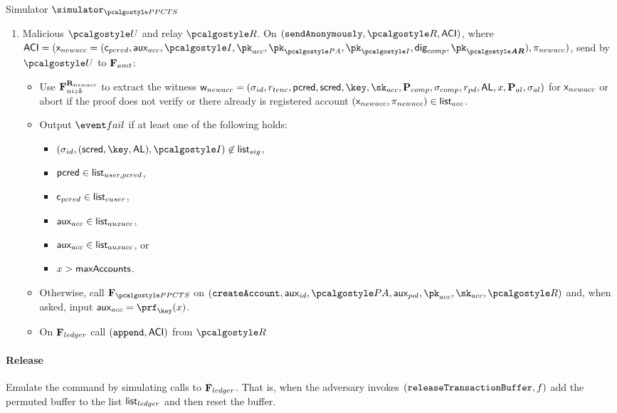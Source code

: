 \documentclass[runningheads,10pt]{llncs}
\numberwithin{equation}{section}
\begin{document}
\begin{simbox}{Simulator $\simulator_{\PPCTS}$}
\begin{enumerate}
  \item Malicious $\user$ and relay $\relay$. On $(\sendAnonymously, \relay, \aci)$, where
      $\aci = (\inp_{newacc}= (\cuser, \aux_{acc}, \idprov, \pk_{acc}, \pk_{\polas},
      \pk_{\idprov}, \policydig, \vec{\pk_{\ar}}), \zkproof_{newacc})$, send by
      $\user$ to $\mathbf{F}_{{amt}}$:
    \begin{itemize}
    \item Use $\mathbf{F}_{{nizk}}^{\mathbf{R}_{newacc}}$ to extract the witness
      $\wit_{newacc} = (\signature_{id}, r_{tenc}, \pcred, \scred, \key, \sk_{acc},
      \comppolicy, \signature_{comp}, r_{pd}, \AL, x, \alpolicy, \signature_{al})$ for
      $\mathsf{x}_{newacc}$ or abort if the proof does not verify or there already is
      registered account $(\mathsf{x}_{newacc}, \mathsf{\pi}_{newacc}) \in {\mathsf{list}_{acc}}$.
    \item Output $\fail$ if at least one of the following holds:
      \begin{itemize}
      \item $(\signature_{id}, (\scred, \key, \AL), \idprov) \not\in
        \listvar{sig}$,
      \item $\mathsf{pcred} \in {\mathsf{list}_{user,pcred}}$,
      \item $\mathsf{c}_{pcred} \in {\mathsf{list}_{cuser}}$,
      \item $\mathsf{aux}_{acc} \in {\mathsf{list}_{auxacc}}$,
      \item $\mathsf{aux}_{acc} \in {\mathsf{list}_{auxacc}}$, or
      \item $x > \mathsf{maxAccounts}$.
      \end{itemize}
    \item Otherwise, call $\func{\PPCTS}$ on
      $(\createAccount, \aux_{id}, \polas, \aux_{pol}, \pk_{acc}, \sk_{acc}, \relay)$
      and, when asked, input $\aux_{acc} = \prf_\key(x)$.
    \item On $\mathbf{F}_{{ledger}}$ call $(\mathtt{append}, \mathsf{ACI})$ from $\relay$
    \end{itemize}
  \end{enumerate}

  \paragraph{Release}
  Emulate the command by simulating calls to $\mathbf{F}_{{ledger}}$. That is, when the
  adversary invokes $(\mathtt{releaseTransactionBuffer}, f)$ add the permuted buffer to the
  list ${\mathsf{list}_{ledger}}$ and then reset the buffer.


\end{simbox}
\end{document}
